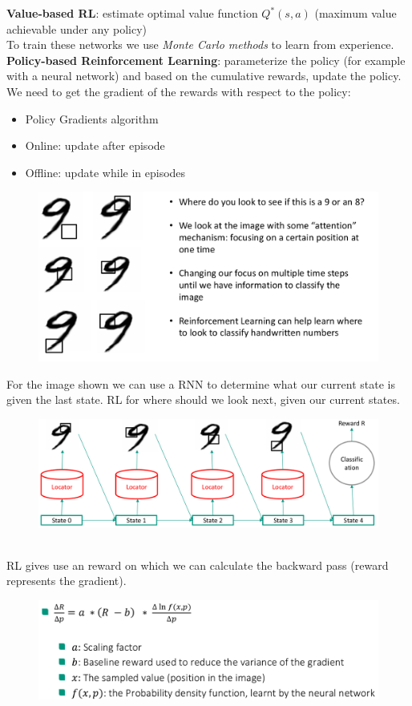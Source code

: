 \textbf{Value-based RL}: estimate optimal value function $Q^*(s, a)$ (maximum value achievable under any policy)\\
To train these networks we use \textit{Monte Carlo methods} to learn from experience.
\textbf{Policy-based Reinforcement Learning}: parameterize the policy (for example with a neural network) and based on the cumulative rewards, update the policy. We need to get the gradient of the rewards with respect to the policy:
\begin{itemize}
	\item Policy Gradients algorithm
	\item Online: update after episode
	\item Offline: update while in episodes
\end{itemize}
\begin{figure}[h]
\includegraphics[scale=0.4]{policy-gradients-with-neural-networks}
\end{figure}
For the image shown we can use a RNN to determine what our current state is given the last state. RL for where should we look next, given our current states.
\begin{figure}[h]
\includegraphics[scale=0.4]{RL-rrn-rl}
\end{figure} \\
RL gives use an reward on which we can calculate the backward pass (reward represents the gradient).
\begin{figure}[h]
\includegraphics[scale=0.4]{policy-gradient-with-neural-networks}
\end{figure}\\[2cm]

